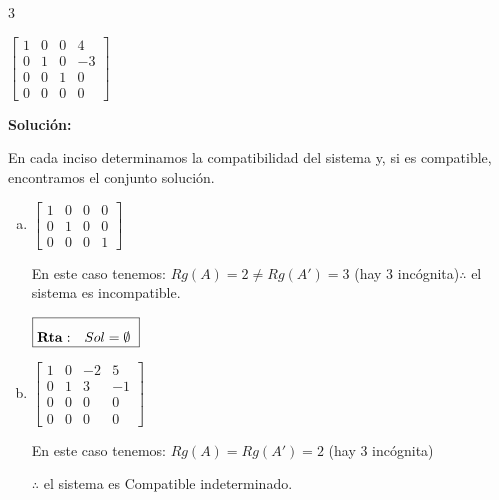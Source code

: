 \documentclass[11pt]{article}
\begin{document}
\begin{enumerate}[\hspace{-5mm} 1) ]
\begin{enumerate}[a) ]
\begin{multicols}{3}
    \item $\left[
\begin{array}{ccc|c}
    1 & 0 & 0 & 4 \\
    0 & 1 & 0 & -3 \\
    0 & 0 & 1 & 0 \\
    0 & 0 & 0 & 0
    \end{array}\right]$
\end{multicols}
\end{enumerate}



    \textbf{Solución:}

En cada inciso determinamos la compatibilidad del sistema y, si es compatible, encontramos el conjunto solución.

\begin{enumerate}[a)]
    \item $\left[
    \begin{array}{ccc|c}
    1 & 0 & 0 & 0 \\
    0 & 1 & 0 & 0 \\
    0 & 0 & 0 & 1
    \end{array}\right]$

\medskip

    En este caso tenemos: $Rg(A) = 2 \neq Rg(A') = 3$  (hay 3 incógnita)\hfill $\therefore$ el sistema es incompatible.
    


 \hfill $\boxed{\rule{0mm}{5mm}{\bf Rta:}\quad  Sol= \emptyset \  }$


\bigskip 


    \item $\left[
    \begin{array}{ccc|c}
    1 & 0 & -2 & 5 \\
    0 & 1 & 3 & -1 \\
    0 & 0 & 0 & 0 \\
    0 & 0 & 0 & 0
    \end{array}\right]$
    \qquad \begin{minipage}{.3\textwidth}

    En este caso tenemos: $Rg(A) =  Rg(A') = 2$  (hay 3 incógnita)
    \end{minipage}\qquad\begin{minipage}{.3\textwidth}
 
    \hfill $\therefore$ el sistema es Compatible indeterminado.
    \end{minipage}
    

\bigskip


\end{enumerate}
\end{enumerate}
\end{document}
